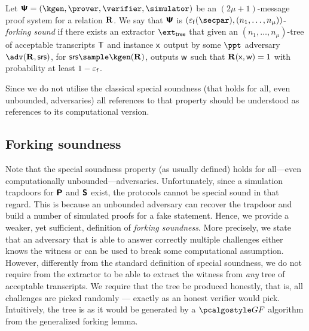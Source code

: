 \begin{definition}
  Let $\proofsystem = (\kgen, \prover, \verifier, \simulator)$ be an
  $(2 \mu + 1)$-message proof system for a relation $\mathbf{R}$. We say that
  $\bm{\mathsf{\Psi}}$ is $(\epsss(\secpar), (n_1, \ldots, n_\mu))$-\emph{forking sound}
  if there exists an extractor $\extt$ that given an $(n_1, \ldots, n_\mu)$-tree
  of acceptable transcripts $\mathsf{T}$ and instance $\mathsf{x}$ output by some $\ppt$ adversary $\adv(\REL,
  \srs)$, for $\srs \sample \kgen(\REL)$, outputs $\mathsf{w}$ such that $\mathbf{R}(\mathsf{x},
  \mathsf{w}) = 1$ with probability at least $1 - \varepsilon_{\mathsf{f}}$.
\end{definition}

Since we do not utilise the classical special soundness (that holds for all,
even unbounded, adversaries) all references to that property should be
understood as references to its computational version.
\fi

\subsection{Forking soundness}
Note that the special soundness property (as usually defined) holds for
all---even computationally unbounded---adversaries. Unfortunately, since a
simulation trapdoors for $\bm{\mathsf{P}}$ and $\bm{\mathsf{S}}$ exist, the protocols
cannot be special sound in that regard. This is because an unbounded adversary
can recover the trapdoor and build a number of simulated proofs for a fake
statement. Hence, we provide a weaker, yet sufficient, definition of
\emph{forking soundness}. More precisely, we state that an
adversary that is able to answer correctly multiple challenges either knows the
witness or can be used to break some computational assumption.
However, differently from the standard definition of special soundness, we do
not require from the extractor to be able to extract the witness from \emph{any}
tree of acceptable transcripts. We require that the tree be produced honestly,
that is, all challenges are picked randomly --- exactly as an honest verifier would pick.
Intuitively, the tree is as it would be generated by a $\genforking$
algorithm from the generalized forking lemma.


